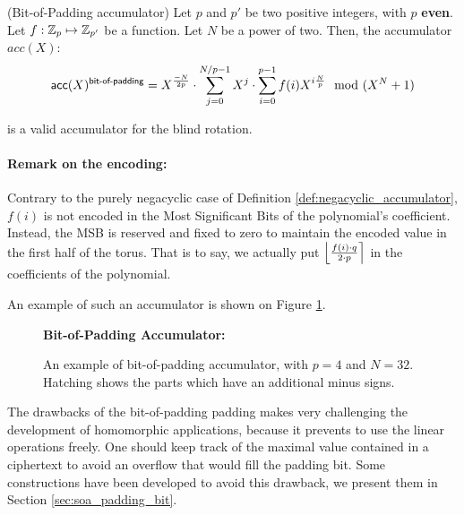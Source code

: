 \begin{definition}(Bit-of-Padding accumulator)
	Let $p$ and $p'$ be two positive integers, with $p$ \textbf{even}. Let $f: \mathbb{Z}_p \mapsto \mathbb{Z}_{p'}$ be a function. Let $N$ be a power of two. Then, the accumulator $acc(X)$:
	\[
		\textsf{acc}(X)^{\textsf{bit-of-padding}} = X^{\frac{-N}{2p}} \cdot \sum_{j=0}^{N / p - 1} X^j \cdot \sum_{i=0}^{p - 1} f(i) X^{i \frac{N}{p}} \mod (X^N + 1)
	\]
	
	is a valid accumulator for the blind rotation.
	\paragraph{Remark on the encoding:}
	Contrary to the purely negacyclic case of Definition \ref{def:negacyclic_accumulator}, $f(i)$ is not encoded in the Most Significant Bits of the polynomial's coefficient. Instead, the MSB is reserved and fixed to zero to maintain the encoded value in the first half of the torus. That is to say, we actually put $\left \lfloor \frac{f(i) \cdot q}{2 \cdot p} \right \rceil$ in the coefficients of the polynomial.
\end{definition}


An example of such an accumulator is shown on Figure \ref{fig:negacyclic_accumulator}.

\begin{figure}[H]
	\centering
				
	\vspace{1.5em}
	
	\textbf{Bit-of-Padding Accumulator:}\\[0.5em]
	
	\caption{An example of bit-of-padding accumulator, with $p=4$ and $N = 32$. Hatching shows the parts which have an additional minus signs.}
	\label{fig:negacyclic_accumulator}
\end{figure}





The drawbacks of the bit-of-padding padding makes very challenging the development of homomorphic applications, because it prevents to use the linear operations freely. One should keep track of the maximal value contained in a ciphertext to avoid an overflow that would fill the padding bit. Some constructions have been developed to avoid this drawback, we present them in Section \ref{sec:soa_padding_bit}.

